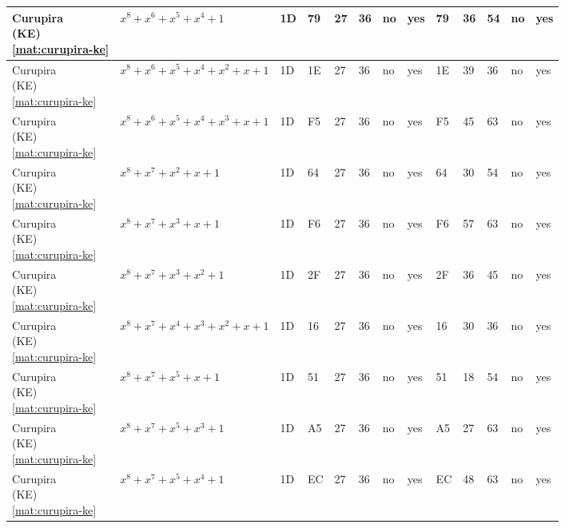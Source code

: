\begin{tiny}
\begin{longtable}{|l|l|l|l|l|l|l|l|l|l|l|l|l|}
\shortstack{Curupira \\ (KE) \\ \eqref{mat:curupira-ke}} & $x^8 + x^6 + x^5 + x^4 + 1$ & 1D & 79 & 27 & 36 & no & yes & 79 & 36 & 54 & no & yes \\ \hline
\shortstack{Curupira \\ (KE) \\ \eqref{mat:curupira-ke}} & $x^8 + x^6 + x^5 + x^4 + x^2 + x + 1$ & 1D & 1E & 27 & 36 & no & yes & 1E & 39 & 36 & no & yes \\ \hline
\shortstack{Curupira \\ (KE) \\ \eqref{mat:curupira-ke}} & $x^8 + x^6 + x^5 + x^4 + x^3 + x + 1$ & 1D & F5 & 27 & 36 & no & yes & F5 & 45 & 63 & no & yes \\ \hline
\shortstack{Curupira \\ (KE) \\ \eqref{mat:curupira-ke}} & $x^8 + x^7 + x^2 + x + 1$ & 1D & 64 & 27 & 36 & no & yes & 64 & 30 & 54 & no & yes \\ \hline
\shortstack{Curupira \\ (KE) \\ \eqref{mat:curupira-ke}} & $x^8 + x^7 + x^3 + x + 1$ & 1D & F6 & 27 & 36 & no & yes & F6 & 57 & 63 & no & yes \\ \hline
\shortstack{Curupira \\ (KE) \\ \eqref{mat:curupira-ke}} & $x^8 + x^7 + x^3 + x^2 + 1$ & 1D & 2F & 27 & 36 & no & yes & 2F & 36 & 45 & no & yes \\ \hline
\shortstack{Curupira \\ (KE) \\ \eqref{mat:curupira-ke}} & $x^8 + x^7 + x^4 + x^3 + x^2 + x + 1$ & 1D & 16 & 27 & 36 & no & yes & 16 & 30 & 36 & no & yes \\ \hline
\shortstack{Curupira \\ (KE) \\ \eqref{mat:curupira-ke}} & $x^8 + x^7 + x^5 + x + 1$ & 1D & 51 & 27 & 36 & no & yes & 51 & 18 & 54 & no & yes \\ \hline
\shortstack{Curupira \\ (KE) \\ \eqref{mat:curupira-ke}} & $x^8 + x^7 + x^5 + x^3 + 1$ & 1D & A5 & 27 & 36 & no & yes & A5 & 27 & 63 & no & yes \\ \hline
\shortstack{Curupira \\ (KE) \\ \eqref{mat:curupira-ke}} & $x^8 + x^7 + x^5 + x^4 + 1$ & 1D & EC & 27 & 36 & no & yes & EC & 48 & 63 & no & yes \\ \hline

\end{longtable}
\end{tiny}
